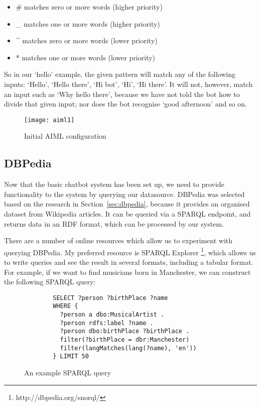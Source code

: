 \begin{itemize}
	\item \# matches zero or more words (higher priority)
	\item \_ matches one or more words (higher priority)
	\item \^{} matches zero or more words (lower priority)
	\item * matches one or more words (lower priority)
\end{itemize}

So in our `hello' example, the given pattern will match any of the following inputs: `Hello', `Hello there', `Hi bot', `Hi', `Hi there'. It will not, however, match an input such as `Why hello there', because we have not told the bot how to divide that given input; nor does the bot recognise `good afternoon' and so on.

\begin{figure}[h]
	\centering
	\texttt{[image: aiml1]}
	\caption{Initial AIML configuration}
	\label{fig:aiml1}
\end{figure}

\newpage
\subsection{DBPedia}
Now that the basic chatbot system has been set up, we need to provide functionality to the system by querying our datasource. DBPedia was selected based on the research in Section~\ref{sec:dbpedia}, because it provides an organised dataset from Wikipedia articles. It can be queried via a SPARQL endpoint, and returns data in an RDF format, which can be processed by our system.

There are a number of online resources which allow us to experiment with querying DBPedia. My preferred resource is SPARQL Explorer \footnote{http://dbpedia.org/snorql/}, which allows us to write queries and see the result in several formats, including a tabular format. For example, if we want to find musicians born in Manchester, we can construct the following SPARQL query:
\begin{figure}[h]
	\begin{lstlisting}
		SELECT ?person ?birthPlace ?name
		WHERE {
		  ?person a dbo:MusicalArtist .
		  ?person rdfs:label ?name .
		  ?person dbo:birthPlace ?birthPlace .
		  filter(?birthPlace = dbr:Manchester)
		  filter(langMatches(lang(?name), 'en'))
		} LIMIT 50 
	\end{lstlisting}
	\caption{An example SPARQL query}
	\label{fig:sparql}
\end{figure}

